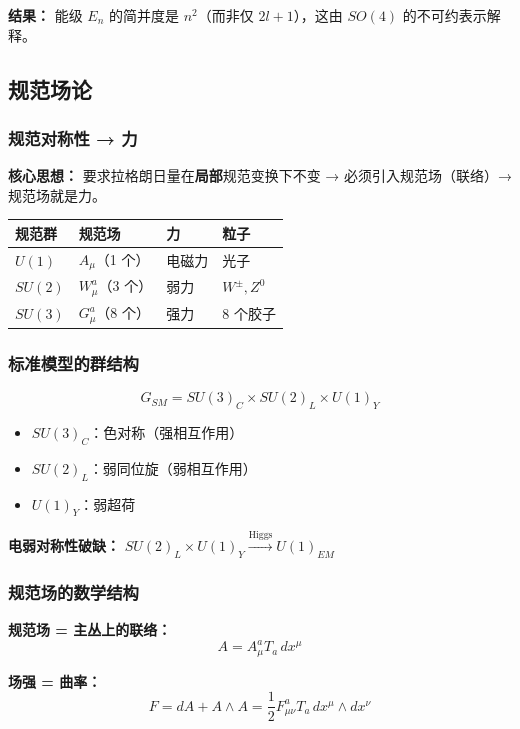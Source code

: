 \textbf{结果：} 能级 $E_n$ 的简并度是 $n^2$（而非仅 $2l+1$），这由 $SO(4)$ 的不可约表示解释。

\subsection{规范场论}

\subsubsection{规范对称性 → 力}

\textbf{核心思想：} 要求拉格朗日量在\textbf{局部}规范变换下不变 → 必须引入规范场（联络）→ 规范场就是力。

\begin{center}
\begin{tabular}{p{2cm}p{3cm}p{3cm}p{4cm}}
\toprule
\textbf{规范群} & \textbf{规范场} & \textbf{力} & \textbf{粒子} \\
\midrule
$U(1)$ & $A_\mu$（1 个） & 电磁力 & 光子 \\
$SU(2)$ & $W_\mu^a$（3 个） & 弱力 & $W^\pm, Z^0$ \\
$SU(3)$ & $G_\mu^a$（8 个） & 强力 & 8 个胶子 \\
\bottomrule
\end{tabular}
\end{center}

\subsubsection{标准模型的群结构}

\[
G_{SM} = SU(3)_C \times SU(2)_L \times U(1)_Y
\]

\begin{itemize}
  \item $SU(3)_C$：色对称（强相互作用）
  \item $SU(2)_L$：弱同位旋（弱相互作用）
  \item $U(1)_Y$：弱超荷
\end{itemize}

\textbf{电弱对称性破缺：} $SU(2)_L \times U(1)_Y \xrightarrow{\text{Higgs}} U(1)_{EM}$

\subsubsection{规范场的数学结构}

\textbf{规范场 = 主丛上的联络：}
\[
A = A_\mu^a T_a\, dx^\mu
\]

\textbf{场强 = 曲率：}
\[
F = dA + A \wedge A = \frac{1}{2}F_{\mu\nu}^a T_a\, dx^\mu \wedge dx^\nu
\]

